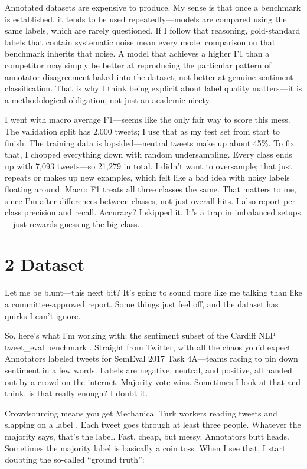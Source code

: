 \documentclass[12pt]{article}
\begin{document}
Annotated datasets are expensive to produce. My sense is that once a benchmark is established, it tends to be used repeatedly---models are compared using the same labels, which are rarely questioned. If I follow that reasoning, gold-standard labels that contain systematic noise mean every model comparison on that benchmark inherits that noise. A model that achieves a higher F1 than a competitor may simply be better at reproducing the particular pattern of annotator disagreement baked into the dataset, not better at genuine sentiment classification. That is why I think being explicit about label quality matters---it is a methodological obligation, not just an academic nicety.

I went with macro average F1---seems like the only fair way to score this mess. The validation split has 2,000 tweets; I use that as my test set from start to finish. The training data is lopsided---neutral tweets make up about 45\%. To fix that, I chopped everything down with random undersampling. Every class ends up with 7,093 tweets---so 21,279 in total. I didn't want to oversample; that just repeats or makes up new examples, which felt like a bad idea with noisy labels floating around. Macro F1 treats all three classes the same. That matters to me, since I'm after differences between classes, not just overall hits. I also report per-class precision and recall. Accuracy? I skipped it. It's a trap in imbalanced setups---just rewards guessing the big class.



\section*{2 Dataset}



Let me be blunt---this next bit? It's going to sound more like me talking than like a committee-approved report. Some things just feel off, and the dataset has quirks I can't ignore.

So, here's what I'm working with: the sentiment subset of the Cardiff NLP tweet\_eval benchmark \citep{barbieri2020tweeteval}. Straight from Twitter, with all the chaos you'd expect. Annotators labeled tweets for SemEval 2017 Task 4A---teams racing to pin down sentiment in a few words. Labels are negative, neutral, and positive, all handed out by a crowd on the internet. Majority vote wins. Sometimes I look at that and think, is that really enough? I doubt it.

Crowdsourcing means you get Mechanical Turk workers reading tweets and slapping on a label \citep{rosenthal2017semeval}. Each tweet goes through at least three people. Whatever the majority says, that's the label. Fast, cheap, but messy. Annotators butt heads. Sometimes the majority label is basically a coin toss. When I see that, I start doubting the so-called ``ground truth'':
\end{document}
